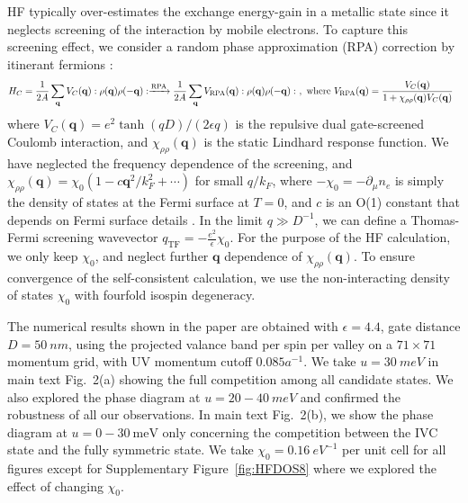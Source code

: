 \documentclass[aps,pra,twocolumn,superscriptaddress,10pt,article,nofootinbib,showpacs,longbibliography]{revtex4-1}
\def \q{{\mathbf q}}
\def \beq{\begin{eqnarray}}
\def \eeq{\end{eqnarray}}
\begin{document}
HF typically over-estimates the exchange energy-gain in a metallic state since it neglects screening of the interaction by mobile electrons. To capture this screening effect, we consider a random phase approximation (RPA) correction by itinerant fermions \cite{coleman_2015}:
\beq
H_C = \frac{1}{2A} \sum_\q V_C(\q) :\rho(\q) \rho(-\q):  \xrightarrow{\text{RPA}} \frac{1}{2A} \sum_\q V_{\rm RPA}(\q) :\rho(\q) \rho(-\q): ~, \text{ where }  V_{\rm RPA}(\q) = \frac{V_C(\q)}{1 + \chi_{\rho \rho}(\q) V_C(\q)} ~~
\label{eq:HRPASM}
\eeq
where $V_C(\q) = e^2 \tanh{(q D)}/(2 \epsilon q)$ is the repulsive dual gate-screened Coulomb interaction, and $\chi_{\rho \rho}(\q)$ is the static Lindhard response function. We have neglected the frequency dependence of the screening, and $\chi_{\rho \rho}(\q) = \chi_0(1 - c \q^2/k_F^2 + \cdots)$ for small $q/k_F$, where $-\chi_0 = -\partial_\mu n_e$ is simply the density of states at the Fermi surface at $T = 0$, and $c$ is an O(1) constant that depends on Fermi surface details \cite{coleman_2015}. In the limit $q \gg D^{-1}$, we can define a Thomas-Fermi screening wavevector $q_{\textrm{TF}} = -\frac{e^2}{\epsilon} \chi_0$. For the purpose of the HF calculation, we only keep $\chi_0$, and neglect further $\q$ dependence of $\chi_{\rho \rho}(\q)$. To ensure convergence of the self-consistent calculation, we use the non-interacting density of states $\chi_0$ with fourfold isospin degeneracy.

The numerical results shown in the paper are obtained with $\epsilon = 4.4$, gate distance $D=\SI{50}{nm}$, using the projected valance band per spin per valley on a $71 \times 71$ momentum grid, with UV momentum cutoff $0.085 a^{-1}$. We take $u = \SI{30}{meV}$ in main text Fig.~2(a) showing the full competition among all candidate states. We also explored the phase diagram at $u = 20 - \SI{40}{meV}$ and confirmed the robustness of all our observations. In main text Fig.~2(b), we show the phase diagram at $u = 0 - \SI{30}{\meV}$ only concerning the competition between the IVC state and the fully symmetric state.
We take $\chi_0 = \SI{0.16}{eV^{-1}}$ per unit cell for all figures except for Supplementary Figure~\ref{fig:HFDOS8} where we explored the effect of changing $\chi_0$. 
\end{document}
